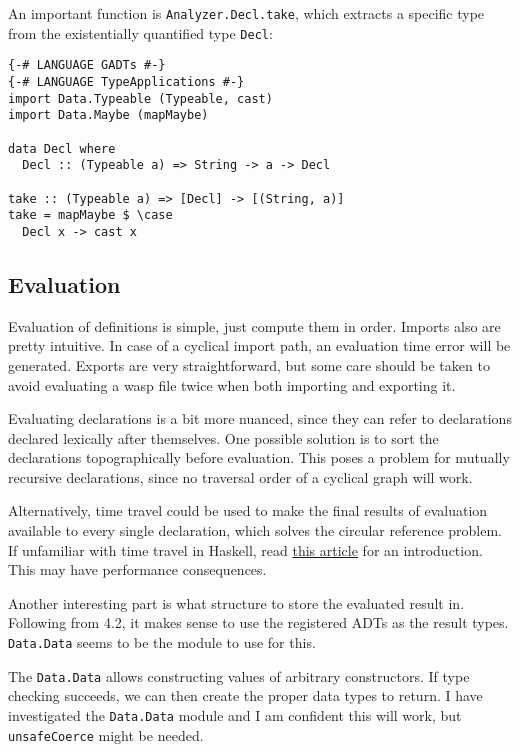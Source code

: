 An important function is \texttt{Analyzer.Decl.take}, which extracts a specific
type from the existentially quantified type \texttt{Decl}:

\begin{minipage}{\linewidth}
\begin{lstlisting}
{-# LANGUAGE GADTs #-}
{-# LANGUAGE TypeApplications #-}
import Data.Typeable (Typeable, cast)
import Data.Maybe (mapMaybe)

data Decl where
  Decl :: (Typeable a) => String -> a -> Decl

take :: (Typeable a) => [Decl] -> [(String, a)]
take = mapMaybe $ \case
  Decl x -> cast x
\end{lstlisting}
\end{minipage}

\subsection{Evaluation}

Evaluation of definitions is simple, just compute them in order. Imports also
are pretty intuitive. In case of a cyclical import path, an evaluation time
error will be generated. Exports are very straightforward, but some care should
be taken to avoid evaluating a wasp file twice when both importing and
exporting it.

Evaluating declarations is a bit more nuanced, since they can refer to
declarations declared lexically after themselves. One possible solution is to
sort the declarations topographically before evaluation. This poses a problem
for mutually recursive declarations, since no traversal order of a cyclical
graph will work.

Alternatively, time travel could be used to make the final results of
evaluation available to every single declaration, which solves
the circular reference problem. If unfamiliar with time travel in Haskell, read
\href{https://blog.csongor.co.uk/time-travel-in-haskell-for-dummies/}{this article}
for an introduction. This may have performance consequences.

Another interesting part is what structure to store the evaluated result in.
Following from 4.2, it makes sense to use the registered ADTs as the result
types. \texttt{Data.Data} seems to be the module to use for this.

The \texttt{Data.Data} allows constructing values of arbitrary constructors.
If type checking succeeds, we can then create the proper data types to return.
I have investigated the \texttt{Data.Data} module and I am confident this will
work, but \texttt{unsafeCoerce} might be needed.

